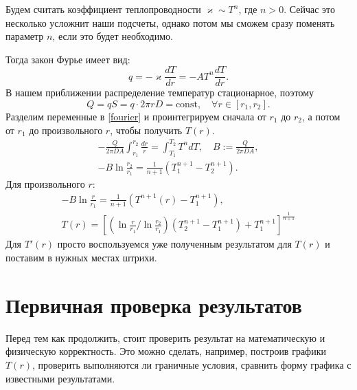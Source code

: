 \documentclass[a4paper,12pt]{report}
\begin{document}
        Будем считать коэффициент теплопроводности $\varkappa \sim T^n$, где $n>0$. Сейчас это несколько усложнит наши подсчеты, однако потом мы сможем сразу поменять параметр $n$, если это будет необходимо.

        Тогда закон Фурье имеет вид:
        \begin{equation}
            \label{fourier}
            q=-\varkappa\frac{dT}{dr}=-AT^n\frac{dT}{dr}.
        \end{equation}
        В нашем приближении распределение температур стационарное, поэтому \begin{equation}
            Q=qS=q\cdot 2\pi r D = \text{const}, \quad \forall r\in[r_1,r_2].
        \end{equation}
        Разделим переменные в \eqref{fourier} и проинтегрируем сначала от $r_1$ до $r_2$, а потом от $r_1$ до произвольного $r$, чтобы получить $T(r)$.
        \begin{gather}
            -\frac{Q}{2\pi D A}\int_{r_1}^{r_2}\frac{dr}{r}=\int_{T_1}^{T_2}T^n dT, \quad B:=\frac{Q}{2\pi D A},\\
            -B\ln \frac{r_2}{r_1}=\frac{1}{n+1}(T_1^{n+1}-T_2^{n+1}).
        \end{gather}
        Для произвольного $r$:
        \begin{gather}
            -B\ln \frac{r}{r_1}=\frac{1}{n+1}(T^{n+1}(r)-T_1^{n+1}),\\
            T(r)=\left[\left(\ln \frac{r}{r_1}/\ln \frac{r_2}{r_1}\right)(T_2^{n+1}-T_1^{n+1})+T_1^{n+1}\right]^{\frac{1}{n+1}}
        \end{gather}
        Для $T'(r)$ просто воспользуемся уже полученным результатом для $T(r)$ и поставим в нужных местах штрихи.

    \section{Первичная проверка результатов}
        Перед тем как продолжить, стоит проверить результат на математическую и физическую корректность. Это можно сделать, например, построив графики $T(r)$, проверить выполняются ли граничные условия, сравнить форму графика с известными результатами.
\end{document}
